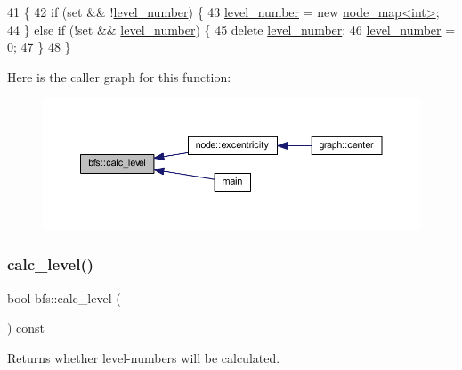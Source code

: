 \begin{DoxyCode}
41 \{
42     \textcolor{keywordflow}{if} (\textcolor{keyword}{set} && !\mbox{\hyperlink{classbfs_aab92e9d128612c28324aafe4750dbc84}{level\_number}}) \{
43     \mbox{\hyperlink{classbfs_aab92e9d128612c28324aafe4750dbc84}{level\_number}} = \textcolor{keyword}{new} \mbox{\hyperlink{classnode__map}{node\_map<int>}};
44     \} \textcolor{keywordflow}{else} \textcolor{keywordflow}{if} (!\textcolor{keyword}{set} && \mbox{\hyperlink{classbfs_aab92e9d128612c28324aafe4750dbc84}{level\_number}}) \{
45     \textcolor{keyword}{delete} \mbox{\hyperlink{classbfs_aab92e9d128612c28324aafe4750dbc84}{level\_number}};
46     \mbox{\hyperlink{classbfs_aab92e9d128612c28324aafe4750dbc84}{level\_number}} = 0;
47     \}
48 \}
\end{DoxyCode}
Here is the caller graph for this function\+:
\nopagebreak
\begin{figure}[H]
\begin{center}
\leavevmode
\includegraphics[width=350pt]{classbfs_a491515da4eb8efca0be4fef0df350a8e_icgraph}
\end{center}
\end{figure}
\mbox{\label{classbfs_a78ea23abb1461e62dd7ecd416fecbd96}} 
\subsubsection{\texorpdfstring{calc\+\_\+level()}{calc\_level()}\hspace{0.1cm}{\footnotesize\ttfamily [2/2]}}
{\footnotesize\ttfamily bool bfs\+::calc\+\_\+level (\begin{DoxyParamCaption}{ }\end{DoxyParamCaption}) const\hspace{0.3cm}{\ttfamily [inline]}}



Returns whether level-\/numbers will be calculated. 


